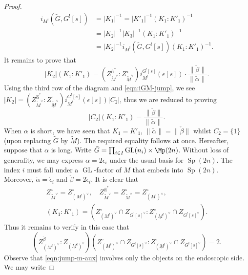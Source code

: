 \documentclass[11pt, a3paper, openany]{article}
\newcommand{\GL}{\operatorname{GL}}
\newcommand{\Sp}{\operatorname{Sp}}
\theoremstyle{remark}
\theoremstyle{remark}
\theoremstyle{remark}
\newenvironment{Proof of claim}
  {\begin{proof}[\normalfont \textbf{Proof of claim}]}
  {\end{proof}}
\begin{document}
\begin{proof}
\begin{align*}
		i_{M^!}(\tilde{G}, G^![s]) & = |K_1|^{-1} = |K'_1|^{-1} (K_1 : K'_1)^{-1} \\
		& = |K_2|^{-1} |K_3|^{-1} (K_1 : K'_1)^{-1} \\
		& = |K_2|^{-1} i_{\underline{M}^!}(\tilde{G}, G^![s]) (K_1 : K'_1)^{-1}.
	\end{align*}
	It remains to prove that
	\begin{equation*}
		|K_2| (K_1 : K'_1) = \left( Z_{\tilde{M}^\vee}^{\hat{\alpha}^*} : Z_{\underline{\tilde{M}}^\vee}^\circ \right)  i^{G^![s]}_{M^!}(\epsilon[s]) \cdot \frac{\|\check{\beta}\|}{\|\check{\alpha}\|} .
	\end{equation*}
	Using the third row of the diagram and \eqref{eqn:iGM-jump}, we see $|K_2| = \left( Z_{\tilde{M}^\vee}^{\hat{\alpha}^*} : Z_{\underline{\tilde{M}}^\vee}^\circ \right)  i^{G^![s]}_{M^!}(\epsilon[s]) |C_2|$, thus we are reduced to proving
	\begin{equation*}
		|C_2| (K_1 : K'_1) = \frac{\|\check{\beta}\|}{\|\check{\alpha}\|}.
	\end{equation*}
	When $\alpha$ is short, we have seen that $K_1 = K'_1$, $\|\check{\alpha}\| = \|\check{\beta}\|$ whilst $C_2 = \{1\}$ (upon replacing $\tilde{G}$ by $\underline{\tilde{M}}$). The required equality follows at once.
	Hereafter, suppose that $\alpha$ is long. Write $\tilde{G} = \prod_{i \in I} \GL(n_i) \times \Mp(2n)$. Without loss of generality, we may express $\alpha = 2\epsilon_i$ under the usual basis for $\Sp(2n)$. The index $i$ must fall under a $\GL$-factor of $M$ that embeds into $\Sp(2n)$. Moreover, $\check{\alpha} = \check{\epsilon}_i$ and $\check{\beta} = 2\check{\epsilon}_i$. It is clear that
	\begin{gather*}
		Z_{\tilde{M}^\vee}^\circ = Z_{(M^!)^\vee}^\circ , \quad Z_{\tilde{M}^\vee}^{\hat{\alpha}^*} = Z_{\underline{\tilde{M}}^\vee}^\circ = Z_{(\underline{M}^!)^\vee}^\circ, \\
		(K_1 : K'_1 ) = \left( Z_{(M^!)^\vee}^\circ \cap Z_{G^![s]^\vee} : Z_{(\underline{M}^!)^\vee}^\circ \cap Z_{G^![s]^\vee} \right).
	\end{gather*}
	Thus it remains to verify in this case that
	\begin{equation}\label{eqn:jump-m-aux}
		\left( Z_{(M^!)^\vee}^{\check{\beta}} : Z_{(\underline{M}^!)^\vee} \right) \left( Z_{(M^!)^\vee}^\circ \cap Z_{G^![s]^\vee} : Z_{(\underline{M}^!)^\vee}^\circ \cap Z_{G^![s]^\vee} \right) = 2.
	\end{equation}
	Observe that \eqref{eqn:jump-m-aux} involves only the objects on the endoscopic side. We may write

\end{proof}
\end{document}
